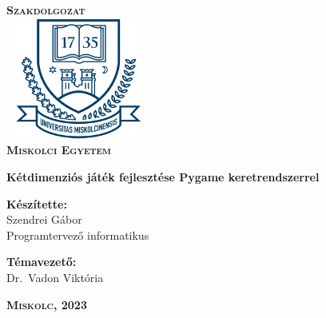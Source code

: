 \begin{titlepage}
\centering
\vspace*{2cm}
\huge\textsc{\textbf{Szakdolgozat}}\\[1cm]
\includegraphics[width=4.8cm, height=4cm,keepaspectratio]{images/me_logo.png}\\
\textbf{\textsc{Miskolci Egyetem}}

\vspace*{2cm}

{\LARGE\textbf{Kétdimenziós játék fejlesztése Pygame keretrendszerrel}}

\vspace*{2cm}
\large
\textbf{Készítette:}\\[0.8ex]
Szendrei Gábor\\[0.8ex]
Programtervező informatikus

\vspace*{0.5cm}
\textbf{Témavezető:}\\[0.8ex]
Dr.\ Vadon Viktória

\vfill

\large
\textbf{\textsc{Miskolc, 2023}}

\end{titlepage}